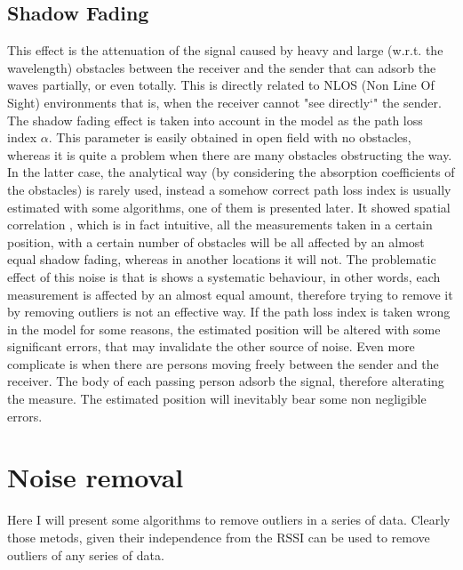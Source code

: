\documentclass[12pt,twoside]{report}
\begin{document}
\section{Shadow Fading}
This effect is the attenuation of the signal caused by heavy and large (w.r.t. the wavelength) obstacles between the receiver and the sender that can adsorb the waves partially, or even totally. This is directly related to NLOS (Non Line Of Sight) environments that is, when the receiver cannot "see directly`" the sender. The shadow fading effect is taken into account in the model as the path loss index $\alpha$. This parameter is easily obtained in open field with no obstacles, whereas it is quite a problem when there are many obstacles obstructing the way. In the latter case, the analytical way (by considering the absorption coefficients of the obstacles) is rarely used, instead a somehow correct path loss index is usually estimated with some algorithms, one of them is presented later. It showed spatial correlation \cite{244122,732812}, which is in fact intuitive, all the measurements taken in a certain position, with a certain number of obstacles will be all affected by an almost equal shadow fading, whereas in another locations it will not. The problematic effect of this noise is that is shows a systematic behaviour, in other words, each measurement is affected by an almost equal amount, therefore trying to remove it by removing outliers is not an effective way. If the path loss index is taken wrong in the model for some reasons, the estimated position will be altered with some significant errors, that may invalidate the other source of noise. Even more complicate is when there are persons moving freely between the sender and the receiver. The body of each passing person adsorb the signal, therefore alterating the measure. The estimated position will inevitably bear some non negligible errors.

\chapter{Noise removal}
Here I will present some algorithms to remove outliers in a series of data. Clearly those metods, given their independence from the RSSI can be used to remove outliers of any series of data.
\end{document}
